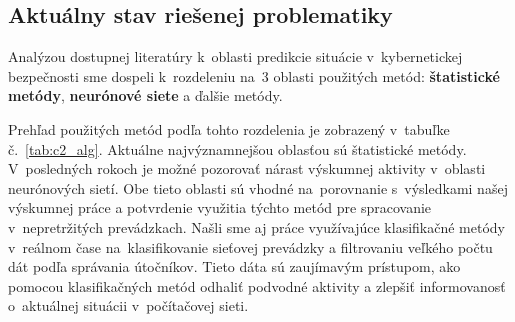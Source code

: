 \documentclass[thesismargins, thesislinespacing, openright, upjsfrontpage]{rnthesis}
\begin{document}

\subsection{Aktuálny stav riešenej problematiky}

Analýzou dostupnej literatúry k~oblasti predikcie situácie v~kybernetickej bezpečnosti sme dospeli k~rozdeleniu na~3 oblasti použitých metód:
\textbf{štatistické metódy}, \textbf{neurónové siete} a ďalšie metódy. 

Prehľad použitých metód podľa tohto rozdelenia je zobrazený v~tabuľke č.~\ref{tab:c2_alg}. Aktuálne najvýznamnejšou oblasťou sú štatistické metódy. V~posledných rokoch je možné pozorovať nárast výskumnej aktivity v~oblasti neurónových sietí. Obe tieto oblasti sú vhodné na~porovnanie s~výsledkami našej výskumnej práce a potvrdenie využitia týchto metód pre spracovanie v~nepretržitých prevádzkach. Našli sme aj práce využívajúce klasifikačné metódy v~reálnom čase na~klasifikovanie sieťovej prevádzky a filtrovaniu veľkého počtu dát podľa správania útočníkov. Tieto dáta sú zaujímavým prístupom, ako pomocou klasifikačných metód odhaliť podvodné aktivity a zlepšiť informovanosť o~aktuálnej situácii v~počítačovej sieti.
\end{document}
